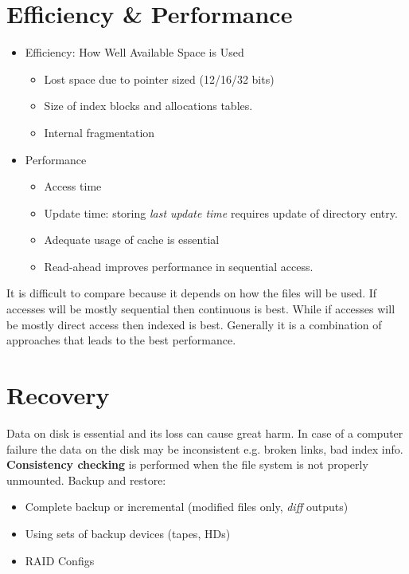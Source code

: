 \documentclass[11pt]{article}
\begin{document}
\section{Efficiency \& Performance}
\label{sec:org0f0a1a9}
\begin{itemize}
\item Efficiency: How Well Available Space is Used
\begin{itemize}
\item Lost space due to pointer sized (12/16/32 bits)
\item Size of index blocks and allocations tables.
\item Internal fragmentation
\end{itemize}

\item Performance
\begin{itemize}
\item Access time
\item Update time: storing \emph{last update time} requires update of directory entry.
\item Adequate usage of cache is essential
\item Read-ahead improves performance in sequential access.
\end{itemize}
\end{itemize}
It is difficult to compare because it depends on how the files will be used.
If accesses will be mostly sequential then continuous is best.
While if accesses will be mostly direct access then indexed is best.
Generally it is a combination of approaches that leads to the best performance.

\section{Recovery}
\label{sec:org59168cc}
Data on disk is essential and its loss can cause great harm.
In case of a computer failure the data on the disk may be inconsistent e.g. broken links, bad index info.
\textbf{Consistency checking} is performed when the file system is not properly unmounted.
Backup and restore:
\begin{itemize}
\item Complete backup or incremental (modified files only, \emph{diff} outputs)
\item Using sets of backup devices (tapes, HDs)
\item RAID Configs
\end{itemize}
\end{document}
